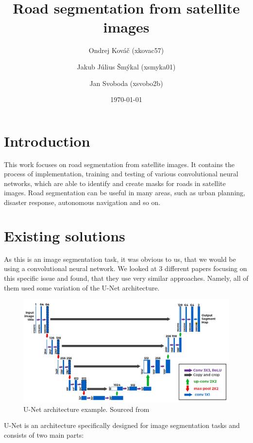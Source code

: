 \documentclass[12pt]{article}
\title{Road segmentation from satellite images}
\author{Ondrej Kováč (xkovac57) \and Jakub Július Šmýkal (xsmyka01) \and Jan Svoboda (xsvobo2b)}
\date{\today}
\begin{document}
\maketitle

\section{Introduction}
This work focuses on road segmentation from satellite images. It contains the process of implementation, training and testing of various convolutional neural networks, which are able to identify and create masks for roads in satellite images. Road segmentation can be useful in many areas, such as urban planning, disaster response, autonomous navigation and so on.


\section{Existing solutions}
As this is an image segmentation task, it was obvious to us, that we would be using a convolutional neural network. We looked at 3 different papers \cite{ref1}\cite{ref2}\cite{ref3} focusing on this specific issue and found, that they use very similar approaches. Namely, all of them used some variation of the U-Net architecture. 

\begin{figure}[h]
  \centering
  \includegraphics[scale = 0.35]{unet.png}
  \caption{U-Net architecture example. Sourced from \cite{g4g}}
  \label{fig:obrazek}
\end{figure}

U-Net is an architecture specifically designed for image segmentation tasks and consists of two main parts:
\end{document}
